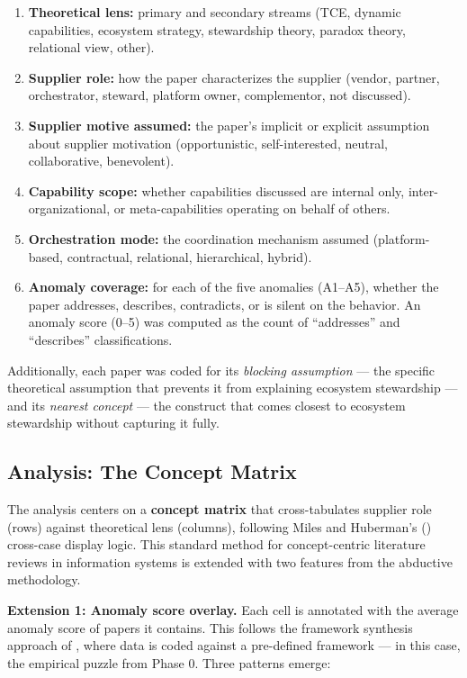 \begin{enumerate}
    \item \textbf{Theoretical lens:} primary and secondary streams (TCE, dynamic capabilities, ecosystem strategy, stewardship theory, paradox theory, relational view, other).
    \item \textbf{Supplier role:} how the paper characterizes the supplier (vendor, partner, orchestrator, steward, platform owner, complementor, not discussed).
    \item \textbf{Supplier motive assumed:} the paper's implicit or explicit assumption about supplier motivation (opportunistic, self-interested, neutral, collaborative, benevolent).
    \item \textbf{Capability scope:} whether capabilities discussed are internal only, inter-organizational, or meta-capabilities operating on behalf of others.
    \item \textbf{Orchestration mode:} the coordination mechanism assumed (platform-based, contractual, relational, hierarchical, hybrid).
    \item \textbf{Anomaly coverage:} for each of the five anomalies (A1--A5), whether the paper addresses, describes, contradicts, or is silent on the behavior. An anomaly score (0--5) was computed as the count of ``addresses'' and ``describes'' classifications.
\end{enumerate}

Additionally, each paper was coded for its \textit{blocking assumption} --- the specific theoretical assumption that prevents it from explaining ecosystem stewardship --- and its \textit{nearest concept} --- the construct that comes closest to ecosystem stewardship without capturing it fully.

\subsection{Analysis: The Concept Matrix}

The analysis centers on a \textbf{concept matrix} \citep{WebsterWatson2002} that cross-tabulates supplier role (rows) against theoretical lens (columns), following Miles and Huberman's (\citeyear{MilesHuberman1994}) cross-case display logic. This standard method for concept-centric literature reviews in information systems is extended with two features from the abductive methodology.

\textbf{Extension 1: Anomaly score overlay.} Each cell is annotated with the average anomaly score of papers it contains. This follows the framework synthesis approach of \citet{Carroll2013}, where data is coded against a pre-defined framework --- in this case, the empirical puzzle from Phase 0. Three patterns emerge:

